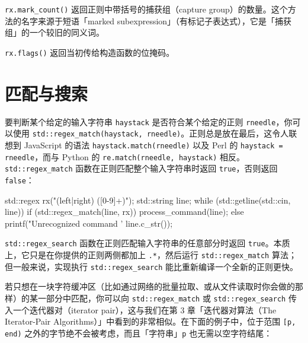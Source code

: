 \texttt{rx.\allowbreak{}mark\_\allowbreak{}count(\allowbreak{})\allowbreak{}} 返回正则中带括号的捕获组（capture group）的数量。这个方法的名字来源于短语「marked subexpression」（有标记子表达式），它是「捕获组」的一个较旧的同义词。

\texttt{rx.\allowbreak{}flags(\allowbreak{})\allowbreak{}} 返回当初传给构造函数的位掩码。

\section{匹配与搜索}

要判断某个给定的输入字符串 \texttt{haystack} 是否符合某个给定的正则 \texttt{rneedle}，你可以使用 \texttt{std::\allowbreak{}regex\_\allowbreak{}match(\allowbreak{}haystack,\allowbreak{} rneedle)\allowbreak{}}。正则总是放在最后，这令人联想到 JavaScript 的语法 \texttt{haystack.\allowbreak{}match(\allowbreak{}rneedle)\allowbreak{}} 以及 Perl 的 \texttt{haystack =~ rneedle}，而与 Python 的 \texttt{re.\allowbreak{}match(\allowbreak{}rneedle,\allowbreak{} haystack)\allowbreak{}} 相反。\texttt{std::\allowbreak{}regex\_\allowbreak{}match} 函数在正则匹配整个输入字符串时返回 \texttt{true}，否则返回 \texttt{false}：

\begin{codebox}[cpp]
     std::regex rx("(left|right) ([0-9]+)");
     std::string line;
     while (std::getline(std::cin, line)) {
       if (std::regex_match(line, rx)) {
         process_command(line);
       } else {
         printf("Unrecognized command '%
           line.c_str());
       }
     }
\end{codebox}

\texttt{std::\allowbreak{}regex\_\allowbreak{}search} 函数在正则匹配输入字符串的任意部分时返回 \texttt{true}。本质上，它只是在你提供的正则两侧都加上 \texttt{.*}，然后运行 \texttt{std::\allowbreak{}regex\_\allowbreak{}match} 算法；但一般来说，实现执行 \texttt{std::\allowbreak{}regex\_\allowbreak{}search} 能比重新编译一个全新的正则更快。

若只想在一块字符缓冲区（比如通过网络的批量拉取、或从文件读取时你会做的那样）的某一部分中匹配，你可以向 \texttt{std::\allowbreak{}regex\_\allowbreak{}match} 或 \texttt{std::\allowbreak{}regex\_\allowbreak{}search} 传入一个迭代器对（iterator pair），这与我们在第 3 章「迭代器对算法（The Iterator-Pair Algorithms）」中看到的非常相似。在下面的例子中，位于范围 \texttt{[p,\allowbreak{} end)\allowbreak{}} 之外的字节绝不会被考虑，而且「字符串」\texttt{p} 也无需以空字符结尾：

